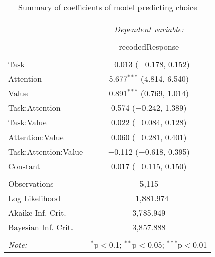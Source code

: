 
\begin{table}[!b] \centering 
  \caption{Summary of coefficients of model predicting choice} 
  \label{table:choiceModel} 
\begin{tabular}{@{\extracolsep{5pt}}lc} 
\\[-1.8ex]\hline 
\hline \\[-1.8ex] 
 & \multicolumn{1}{c}{\textit{Dependent variable:}} \\ 
\cline{2-2} 
\\[-1.8ex] & recodedResponse \\ 
\hline \\[-1.8ex] 
 Task & $-$0.013 ($-$0.178, 0.152) \\ 
  Attention & 5.677$^{***}$ (4.814, 6.540) \\ 
  Value & 0.891$^{***}$ (0.769, 1.014) \\ 
  Task:Attention & 0.574 ($-$0.242, 1.389) \\ 
  Task:Value & 0.022 ($-$0.084, 0.128) \\ 
  Attention:Value & 0.060 ($-$0.281, 0.401) \\ 
  Task:Attention:Value & $-$0.112 ($-$0.618, 0.395) \\ 
  Constant & 0.017 ($-$0.115, 0.150) \\ 
 \hline \\[-1.8ex] 
Observations & 5,115 \\ 
Log Likelihood & $-$1,881.974 \\ 
Akaike Inf. Crit. & 3,785.949 \\ 
Bayesian Inf. Crit. & 3,857.888 \\ 
\hline 
\hline \\[-1.8ex] 
\textit{Note:}  & \multicolumn{1}{r}{$^{*}$p$<$0.1; $^{**}$p$<$0.05; $^{***}$p$<$0.01} \\ 
\end{tabular} 
\end{table} 
